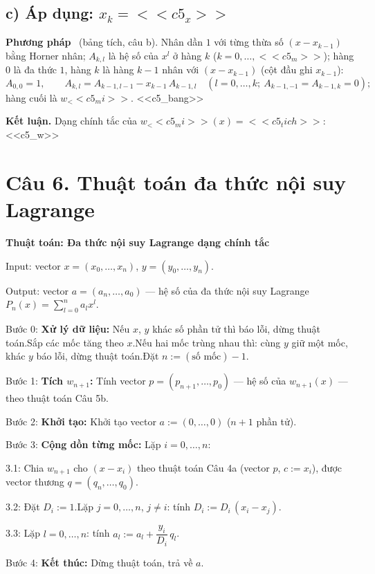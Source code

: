 \documentclass[11pt,a4paper]{article}
\newenvironment{ketluan}
  {\par\medskip\noindent\begin{lrbox}{\klbox}\begin{minipage}{\dimexpr\linewidth-12pt\relax}\textbf{Kết luận. }}
  {\end{minipage}\end{lrbox}\setlength{\fboxsep}{5pt}\fbox{\usebox{\klbox}}\par\medskip}
\newenvironment{thuattoan}[1]
  {\par\medskip\noindent\textbf{Thuật toán: #1}\begin{description}[style=standard,align=left,leftmargin=4.3em,labelwidth=3.9em,labelsep=0.4em,itemsep=1pt,topsep=3pt,font=\normalfont\bfseries]}
  {\end{description}}
\newenvironment{con}
  {\begin{description}[style=standard,align=left,leftmargin=2.1em,labelwidth=1.8em,labelsep=0.3em,itemsep=0pt,topsep=1pt,font=\normalfont]}
  {\end{description}}
\newcommand{\pp}[1]{\par\smallskip\noindent\textbf{#1}\ }
\begin{document}
\subsection{c) Áp dụng: $x_k=<<c5_x>>$}
\pp{Phương pháp} (bảng tích, câu b). Nhân dần $1$ với từng thừa số $(x-x_{k-1})$ bằng Horner nhân; $A_{k,l}$ là hệ số của $x^l$ ở hàng $k$ ($k=0,\dots,<<c5_m>>$); hàng $0$ là đa thức $1$, hàng $k$ là hàng $k-1$ nhân với $(x-x_{k-1})$ (cột đầu ghi $x_{k-1}$):
\[ A_{0,0}=1,\qquad A_{k,l}=A_{k-1,l-1}-x_{k-1}\,A_{k-1,l}\quad(l=0,\dots,k;\ A_{k-1,-1}=A_{k-1,k}=0); \]
hàng cuối là $w_<<c5_mi>>$.
<<c5_bang>>
\begin{ketluan}
Dạng chính tắc của $w_<<c5_mi>>(x)=<<c5_tich>>$:
<<c5_w>>
\end{ketluan}

\section{Câu 6. Thuật toán đa thức nội suy Lagrange}

\begin{thuattoan}{Đa thức nội suy Lagrange dạng chính tắc}
\item[Input:] vector $x=(x_0,\dots,x_n)$, $y=(y_0,\dots,y_n)$.
\item[Output:] vector $a=(a_n,\dots,a_0)$ — hệ số của đa thức nội suy Lagrange $P_n(x)=\sum_{l=0}^{n}a_lx^l$.
\item[Bước 0:] \textbf{Xử lý dữ liệu:} Nếu $x$, $y$ khác số phần tử thì báo lỗi, dừng thuật toán.\newline Sắp các mốc tăng theo $x$.\newline Nếu hai mốc trùng nhau thì: cùng $y$ giữ một mốc, khác $y$ báo lỗi, dừng thuật toán.\newline Đặt $n:=(\text{số mốc})-1$.
\item[Bước 1:] \textbf{Tích $w_{n+1}$:} Tính vector $p=(p_{n+1},\dots,p_0)$ — hệ số của $w_{n+1}(x)$ — theo thuật toán Câu 5b.
\item[Bước 2:] \textbf{Khởi tạo:} Khởi tạo vector $a:=(0,\dots,0)$ ($n+1$ phần tử).
\item[Bước 3:] \textbf{Cộng dồn từng mốc:} Lặp $i=0,\dots,n$:
  \begin{con}
  \item[3.1:] Chia $w_{n+1}$ cho $(x-x_i)$ theo thuật toán Câu 4a (vector $p$, $c:=x_i$), được vector thương \mbox{$q=(q_n,\dots,q_0)$}.
  \item[3.2:] Đặt $D_i:=1$.\newline Lặp $j=0,\dots,n$, $j\ne i$: tính $D_i:=D_i\,(x_i-x_j)$.
  \item[3.3:] Lặp $l=0,\dots,n$: tính $a_l:=a_l+\dfrac{y_i}{D_i}\,q_l$.
  \end{con}
\item[Bước 4:] \textbf{Kết thúc:} Dừng thuật toán, trả về $a$.
\end{thuattoan}
\end{document}
